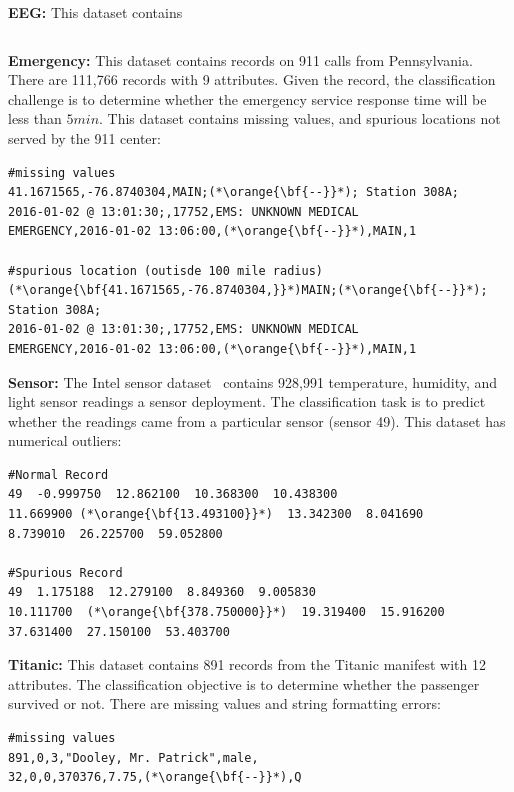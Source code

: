 \vspace{0.5em}\noindent\textbf{EEG: } This dataset contains 
\begin{lstlisting}

\end{lstlisting}

\vspace{0.5em}\noindent\textbf{Emergency: } This dataset contains records on 911 calls from Pennsylvania. There are 111,766 records with 9 attributes. Given the record, the classification challenge is to determine whether the emergency service response time will be less than $5 min$. This dataset contains missing values, and spurious locations not served by the 911 center:
\begin{lstlisting}
#missing values
41.1671565,-76.8740304,MAIN;(*\orange{\bf{--}}*); Station 308A;
2016-01-02 @ 13:01:30;,17752,EMS: UNKNOWN MEDICAL
EMERGENCY,2016-01-02 13:06:00,(*\orange{\bf{--}}*),MAIN,1

#spurious location (outisde 100 mile radius)
(*\orange{\bf{41.1671565,-76.8740304,}}*)MAIN;(*\orange{\bf{--}}*); Station 308A;
2016-01-02 @ 13:01:30;,17752,EMS: UNKNOWN MEDICAL 
EMERGENCY,2016-01-02 13:06:00,(*\orange{\bf{--}}*),MAIN,1
\end{lstlisting}

\vspace{0.5em}\noindent\textbf{Sensor: } The Intel sensor dataset~\cite{} contains 928,991 temperature, humidity, and light sensor readings a sensor deployment. The classification task is to predict whether the readings came from a particular sensor (sensor 49). This dataset has numerical outliers:
\begin{lstlisting}
#Normal Record
49  -0.999750  12.862100  10.368300  10.438300  
11.669900 (*\orange{\bf{13.493100}}*)  13.342300  8.041690  
8.739010  26.225700  59.052800

#Spurious Record
49  1.175188  12.279100  8.849360  9.005830  
10.111700  (*\orange{\bf{378.750000}}*)  19.319400  15.916200  
37.631400  27.150100  53.403700
\end{lstlisting}

\vspace{0.5em}\noindent\textbf{Titanic: } This dataset contains 891 records from the Titanic manifest with 12 attributes. The classification objective is to determine whether the passenger survived or not. There are missing values and string formatting errors:

\begin{lstlisting}
#missing values
891,0,3,"Dooley, Mr. Patrick",male,
32,0,0,370376,7.75,(*\orange{\bf{--}}*),Q
\end{lstlisting}


